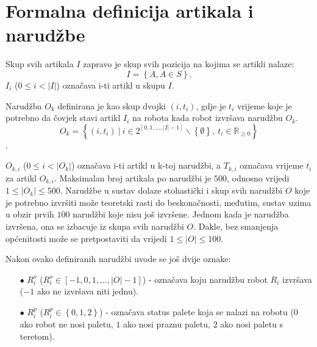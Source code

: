\documentclass[times, utf8, seminar]{fer}
\begin{document}
\pagebreak

\section{Formalna definicija artikala i narudžbe}
Skup svih artikala $I$ zapravo je skup svih pozicija na kojima se artikli nalaze:
\begin{equation}
I = \left\{A, A \in S\right\}.
\end{equation}
$I_i$ ($0 \le i < |I|$) označava i-ti artikl u skupu $I$. 

Narudžba $O_k$ definirana
je kao skup dvojki $(i, t_{i})$, gdje je $t_{i}$ vrijeme koje je potrebno 
da čovjek stavi artikl $I_i$ na robota kada robot izvršava narudžbu $O_k$.
\begin{equation}
O_k = \left\{ (i, t_{i})\ |\ i \in 2^{[0, 1, ..., |I|-1]}\backslash\left\{\emptyset\right\},\ t_{i} \in \mathbb{R}_{\ge0}\right\}
\end{equation}.

$O_{k, i}$ ($0 \le i < |O_k|$) označava i-ti artikl u k-toj narudžbi, a $T_{k, i}$ označava
vrijeme $t_i$ za artikl $O_{k, i}$. Maksimalan broj artikala po narudžbi
je $500$, odnosno vrijedi $1 \le |O_k| \le 500$. Narudžbe u sustav dolaze stohastički
i skup svih narudžbi $O$ koje je potrebno izvršiti može teoretski rasti do beskonačnosti,
međutim, sustav uzima u obzir prvih $100$ narudžbi koje nisu još izvršene. Jednom kada 
je narudžba izvršena, ona se izbacuje iz skupa svih narudžbi $O$. Dakle, bez smanjenja općenitosti
može se pretpostaviti da vrijedi $1 \le |O| \le 100$.

Nakon ovako definiranih narudžbi uvode se još dvije oznake:
\begin{itemize}
    \item[$\bullet$] $R_{i}^{o}$ ($R_{i}^{o} \in [-1, 0, 1, ..., |O| - 1]$) - označava koju narudžbu
                     robot $R_i$ izvršava ($-1$ ako ne izvršava niti jednu).
    \item[$\bullet$] $R_{i}^{p}$ ($R_{i}^{p} \in \left\{0, 1, 2\right\}$) - označava status palete
                     koja se nalazi na robotu ($0$ ako robot ne nosi paletu, $1$ ako nosi praznu paletu, $2$ ako nosi paletu s teretom).
\end{itemize}
\end{document}
